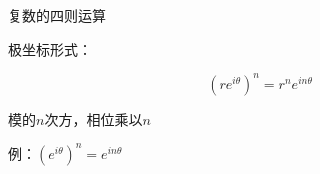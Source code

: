 \documentclass[aspectratio=169,11pt]{beamer}
\begin{document}
\begin{frame}{复数的四则运算}
{\begin{iqbitemize}
    \end{iqbitemize}
    \iqbsep

    \begin{iqbitemize}
    \item 极坐标形式：
    \end{iqbitemize}
      \[
        (re^{i\theta})^n = r^n e^{in\theta}
      \]
    \begin{iqbitemize}
      \item 模的$n$次方，相位乘以$n$
      \item 例：$(e^{i\theta})^n = e^{in\theta}$
    \end{iqbitemize}
  }
\end{frame}

\end{document}
